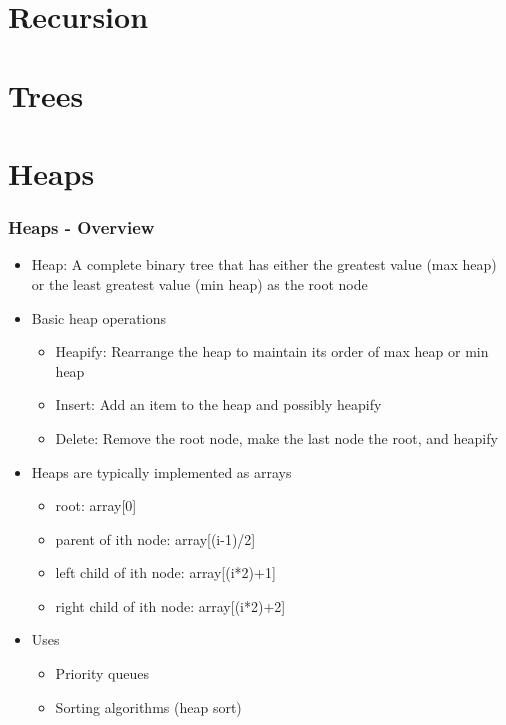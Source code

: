 \documentclass[c, aspectratio=169]{beamer}
\begin{document}
\section{Recursion}
\begin{frame}\end{frame}
\begin{frame}\end{frame}
\begin{frame}\end{frame}

\section{Trees}
\begin{frame}\end{frame}
\begin{frame}\end{frame}
\begin{frame}\end{frame}

\section{Heaps}
\begin{frame}\frametitle{Heaps - Overview}
\begin{itemize}
\item Heap: A complete binary tree that has either the greatest value (max heap) or the least greatest value (min heap) as the root node
\item Basic heap operations
	\begin{itemize}
	\item Heapify: Rearrange the heap to maintain its order of max heap or min heap
	\item Insert: Add an item to the heap and possibly heapify
	\item Delete: Remove the root node, make the last node the root, and heapify
	\end{itemize}
\item Heaps are typically implemented as arrays
	\begin{itemize}
	\item root: array[0]
	\item parent of ith node: array[(i-1)/2]
	\item left child of ith node: array[(i*2)+1]
	\item right child of ith node: array[(i*2)+2]
	\end{itemize}
\item Uses
	\begin{itemize}
	\item Priority queues
	\item Sorting algorithms (heap sort)
	\end{itemize}
\end{itemize}
\end{frame}
\end{document}
